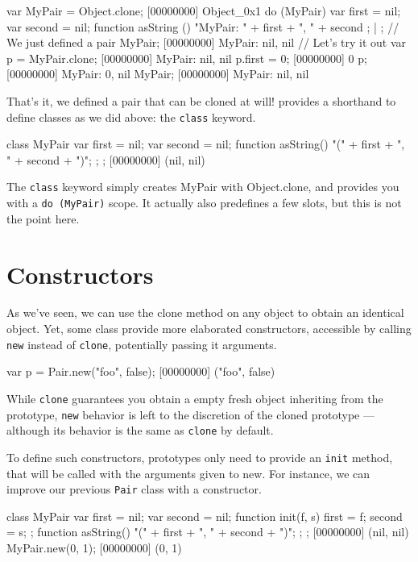 \begin{urbiscript}
var MyPair = Object.clone;
[00000000] Object_0x1
do (MyPair)
{
  var first = nil;
  var second = nil;
  function asString ()
  {
    "MyPair: " + first + ", " + second
  };
} | {};
// We just defined a pair
MyPair;
[00000000] MyPair: nil, nil
// Let's try it out
var p = MyPair.clone;
[00000000] MyPair: nil, nil
p.first = 0;
[00000000] 0
p;
[00000000] MyPair: 0, nil
MyPair;
[00000000] MyPair: nil, nil
\end{urbiscript}

That's it, we defined a pair that can be cloned at will! \us
provides a shorthand to define classes as we did above: the
\lstinline{class} keyword.

\begin{urbiscript}
class MyPair
{
  var first = nil;
  var second = nil;
  function asString() { "(" + first + ", " + second + ")"; };
};
[00000000] (nil, nil)
\end{urbiscript}

The \lstinline{class} keyword simply creates MyPair with Object.clone,
and provides you with a \lstinline|do (MyPair)| scope. It actually also
predefines a few slots, but this is not the point here.

\section{Constructors}
\label{sec:tut:ctor}
As we've seen, we can use the clone method on any object to obtain an
identical object. Yet, some class provide more elaborated
constructors, accessible by calling \lstinline{new} instead of
\lstinline{clone}, potentially passing it arguments.

\begin{urbiscript}
var p = Pair.new("foo", false);
[00000000] ("foo", false)
\end{urbiscript}

While \lstinline{clone} guarantees you obtain a empty fresh object
inheriting from the prototype, \lstinline{new} behavior is left to the
discretion of the cloned prototype --- although its behavior is the
same as \lstinline{clone} by default.

To define such constructors, prototypes only need to provide an
\lstinline{init} method, that will be called with the arguments given to
new. For instance, we can improve our previous \lstinline{Pair} class
with a constructor.

\begin{urbiscript}
class MyPair
{
  var first = nil;
  var second = nil;
  function init(f, s) { first = f;   second = s;  };
  function asString() { "(" + first + ", " + second + ")"; };
};
[00000000] (nil, nil)
MyPair.new(0, 1);
[00000000] (0, 1)
\end{urbiscript}

